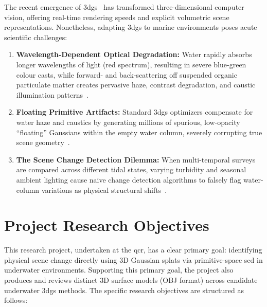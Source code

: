 The recent emergence of \gls{3dgs}~\cite{10897713} has transformed three-dimensional computer vision, offering real-time rendering speeds and explicit volumetric scene representations. Nonetheless, adapting \gls{3dgs} to marine environments poses acute scientific challenges:
\begin{enumerate}
    \item \textbf{Wavelength-Dependent Optical Degradation:} Water rapidly absorbs longer wavelengths of light (red spectrum), resulting in severe blue-green colour casts, while forward- and back-scattering off suspended organic particulate matter creates pervasive haze, contrast degradation, and caustic illumination patterns~\cite{10203316, 11128502}.
    \item \textbf{Floating Primitive Artifacts:} Standard \gls{3dgs} optimizers compensate for water haze and caustics by generating millions of spurious, low-opacity ``floating'' Gaussians within the empty water column, severely corrupting true scene geometry~\cite{guedon2024sugar}.
    \item \textbf{The Scene Change Detection Dilemma:} When multi-temporal surveys are compared across different tidal states, varying turbidity and seasonal ambient lighting cause naive change detection algorithms to falsely flag water-column variations as physical structural shifts~\cite{galappaththige2026pixelsprimitivesscenechange}.
\end{enumerate}

\section{Project Research Objectives}
\label{sec:objectives}
This research project, undertaken at the \gls{qcr}, has a clear primary goal: identifying physical scene change directly using 3D Gaussian splats via primitive-space \gls{scd} in underwater environments. Supporting this primary goal, the project also produces and reviews distinct 3D surface models (OBJ format) across candidate underwater \gls{3dgs} methods. The specific research objectives are structured as follows:

